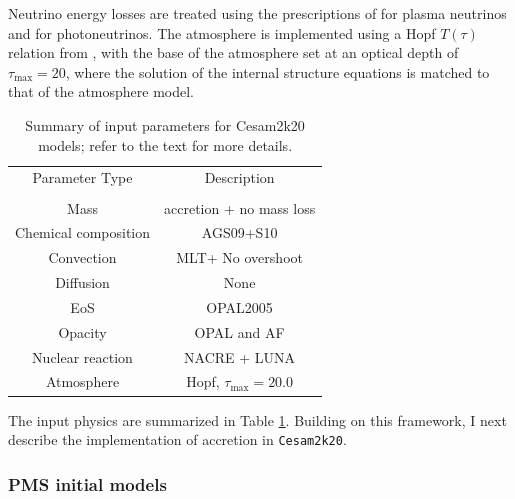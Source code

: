 \documentclass[12pt,a4paper]{article}
\begin{document}
Neutrino energy losses are treated using the prescriptions of \textcite{HaftEtAl1994} for plasma neutrinos and \textcite{Weigert1966} for photoneutrinos. The atmosphere is implemented using a Hopf $T(\tau)$ relation from \textcite{HubenyMihalas2015}, with the base of the atmosphere set at an optical depth of $\tau_{\max} = 20$, where the solution of the internal structure equations is matched to that of the atmosphere model.

\begin{table}
    \hfill
    \begin{tabularx}{.8\textwidth}{|| c | c ||}
        \cline{1-2}
        Parameter Type & Description \\ \cline{1-2}\\[-1em]\cline{1-2}
        Mass & accretion + no mass loss\\ \cline{1-2}
        Chemical composition  & AGS09+S10\footnotemark[1]\\ \cline{1-2}
        Convection & MLT\footnotemark[2] + No overshoot\\ \cline{1-2}
        Diffusion & None \\ \cline{1-2}
        EoS & OPAL2005\footnotemark[3] \\ \cline{1-2}
        Opacity & OPAL and AF \footnotemark[4]\\ \cline{1-2}
        Nuclear reaction & NACRE + LUNA\footnotemark[5]\\ \cline{1-2}
        Atmosphere & Hopf\footnotemark[6], $\tau_{\max} = 20.0$\\ \cline{1-2}
    \end{tabularx}
    \caption{Summary of input parameters for Cesam2k20 models; refer to the text for more details.} \label{tab:input_physics}
    \hfill
\end{table}

The input physics are summarized in Table \ref{tab:input_physics}. Building on this framework, I next describe the implementation of accretion in \texttt{Cesam2k20}.

\subsubsection{PMS initial models}
\label{sec:pms_initial_models}
\end{document}
